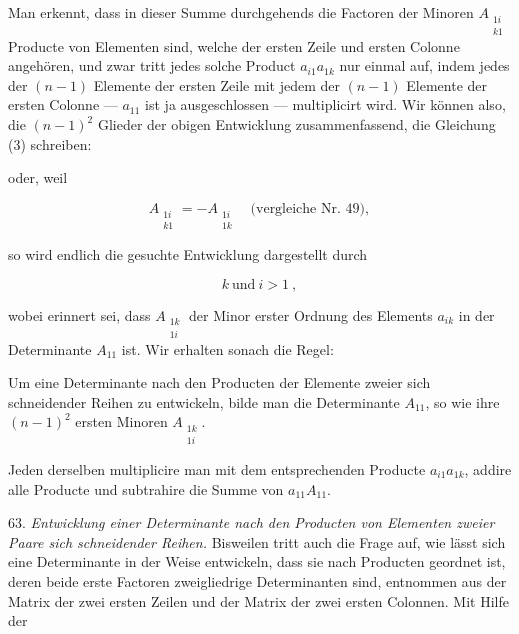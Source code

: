 Man erkennt, dass in dieser Summe durchgehends die Factoren der Minoren $A_{\substack{1i\\k1}}$
Producte von Elementen sind, welche der ersten Zeile und ersten Colonne angeh\"oren, und zwar
tritt jedes solche Product $a_{i1}a_{1k}$ nur einmal auf, indem jedes der $(n-1)$ Elemente der
ersten Zeile mit jedem der $(n-1)$ Elemente der ersten Colonne --- $a_{11}$ ist ja
ausgeschlossen --- multiplicirt wird. Wir k\"onnen also, die $(n-1)^2$ Glieder der obigen
Entwicklung zusammenfassend, die Gleichung (3) schreiben:


oder, weil

\[
A_{\substack{1i\\k1}} = -A_{\substack{1i\\1k}}\quad \text{(vergleiche Nr. 49)},
\]

so wird endlich die gesuchte Entwicklung dargestellt durch


\[
k\ \text{und}\ i > 1\ ,
\]

wobei erinnert sei, dass $A_{\substack{1k\\1i}}$ der Minor erster Ordnung des Elements
$a_{ik}$ in der Determinante $A_{11}$ ist. Wir erhalten sonach die Regel:

\glqq Um eine Determinante nach den Producten der Elemente zweier sich schneidender Reihen zu
entwickeln, bilde man die Determinante $A_{11}$, so wie ihre $(n-1)^2$ ersten Minoren
$A_{\substack{1k\\1i}}$.

Jeden derselben multiplicire man mit dem entsprechenden Producte $a_{i1}a_{1k}$, addire alle
Producte und subtrahire die Summe von $a_{11}A_{11}$\grqq{}.

63. \textit{Entwicklung einer Determinante nach den Producten von Elementen zweier Paare
sich schneidender Reihen.} Bisweilen tritt auch die Frage auf, wie l\"asst sich eine
Determinante in der Weise entwickeln, dass sie nach Producten geordnet ist, deren beide erste
Factoren zweigliedrige Determinanten sind, entnommen aus der Matrix der zwei ersten Zeilen
und der Matrix der zwei ersten Colonnen. Mit Hilfe der


